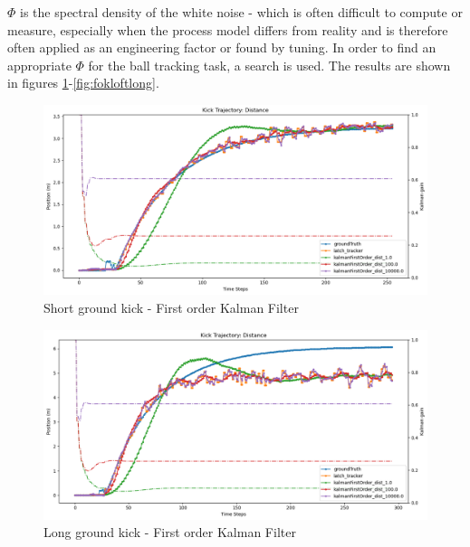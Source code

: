 \documentclass[a4paper,twoside,12pt]{report}
\begin{document}
$\Phi$ is the spectral density of the white noise - which is often difficult to compute or measure, especially when the process model differs from reality and is therefore often applied as an engineering factor or found by tuning. In order to find an appropriate $\Phi$ for the ball tracking task, a search is used. The results are shown in figures \ref{fig:fokgroundshort}-\ref{fig:fokloftlong}.

\begin{figure}[h!]
\begin{center}
\includegraphics[width=12cm]{images/fok_ground_short.png}
\caption{Short ground kick - First order Kalman Filter}
\label{fig:fokgroundshort}
\end{center}
\end{figure}

\begin{figure}[h!]
\begin{center}
\includegraphics[width=12cm]{images/fok_ground_long.png}
\caption{Long ground kick - First order Kalman Filter}
\label{fig:fokgroundlong}
\end{center}
\end{figure}
\end{document}

